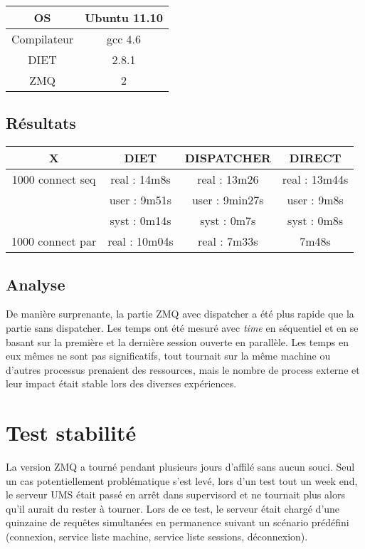 \documentclass{article}
\begin{document}
\begin{tabular}{|c|c|}
\hline
OS & Ubuntu 11.10 \\
\hline
Compilateur & gcc 4.6 \\
\hline
DIET & 2.8.1 \\
\hline
ZMQ & 2 \\
\hline
\end{tabular}

\subsection{R\'esultats}

\begin{tabular}{|c|c|c|c|}
\hline
 X & DIET & DISPATCHER & DIRECT \\
\hline
1000 connect seq & real : 14m8s & real : 13m26 & real : 13m44s \\
 & user : 9m51s & user : 9min27s & user : 9m8s \\
 & syst : 0m14s & syst : 0m7s & syst : 0m8s \\
\hline
1000 connect par & real : 10m04s & real : 7m33s & 7m48s \\
\hline
\end{tabular}

\subsection{Analyse}
De manière surprenante, la partie ZMQ avec dispatcher a été plus rapide que
 la partie sans dispatcher. Les temps ont été mesuré avec \textit{time} 
en séquentiel et en se basant sur la première et la dernière session 
ouverte en parallèle. Les temps en eux mêmes ne sont pas significatifs,
tout tournait sur la même machine ou d'autres processus prenaient des
ressources, mais le nombre de process externe et leur impact était stable
 lors des diverses expériences.

\section{Test stabilité}
La version ZMQ a tourné pendant plusieurs jours d'affilé sans aucun souci.
Seul un cas potentiellement problématique s'est levé, lors d'un test tout
un week end, le serveur UMS était passé en arrêt dans supervisord et ne 
tournait plus alors qu'il aurait du rester à tourner.
Lors de ce test, le serveur était chargé d'une quinzaine de requêtes
simultanées en permanence suivant un scénario prédéfini 
(connexion, service liste machine, service liste sessions, déconnexion).
\end{document}
